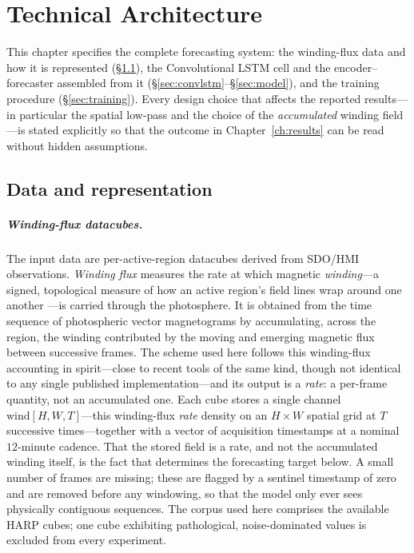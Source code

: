 \chapter{Technical Architecture}
\label{ch:arch}

This chapter specifies the complete forecasting system: the winding-flux data
and how it is represented (\S\ref{sec:data}), the Convolutional LSTM cell and the
encoder--forecaster assembled from it (\S\ref{sec:convlstm}--\S\ref{sec:model}),
and the training procedure (\S\ref{sec:training}). Every design choice that
affects the reported results---in particular the spatial low-pass and the choice
of the \emph{accumulated} winding field---is stated explicitly so that the
outcome in Chapter~\ref{ch:results} can be read without hidden assumptions.

\section{Data and representation}
\label{sec:data}

\paragraph{Winding-flux datacubes.}
The input data are per-active-region datacubes derived from SDO/HMI
observations. \emph{Winding flux} measures the rate at which magnetic
\emph{winding}---a signed, topological measure of how an active region's field
lines wrap around one another \citep{mactaggart2021}---is carried through the
photosphere. It is obtained from the time sequence of photospheric vector
magnetograms by accumulating, across the region, the winding contributed by the
moving and emerging magnetic flux between successive frames. The scheme used here
follows this winding-flux accounting in spirit---close to recent tools of the
same kind, though not identical to any single published implementation---and its
output is a \emph{rate}: a per-frame quantity, not an accumulated one. Each cube
stores a single channel $\mathrm{wind}[H,W,T]$---this winding-flux \emph{rate}
density on an $H\times W$ spatial grid at $T$ successive times---together with a
vector of acquisition timestamps at a nominal $12$-minute cadence. That the
stored field is a rate, and not the accumulated winding itself, is the fact that
determines the forecasting target below. A small number of frames are missing; these are flagged by a sentinel
timestamp of zero and are removed before any windowing, so that the model only
ever sees physically contiguous sequences. The corpus used here comprises the
available HARP cubes; one cube exhibiting pathological, noise-dominated values
is excluded from every experiment.


